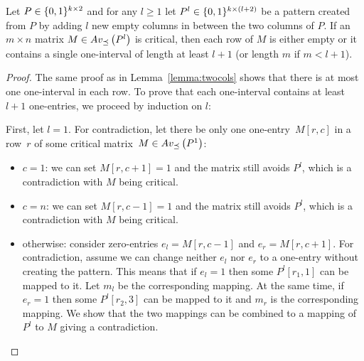 \begin{lemma}
\label{lemma:maxmult}
Let $P\in\{0,1\}^{k\times2}$ and for any $l\geq1$ let $P^l\in\{0,1\}^{k\times(l+2)}$ be a pattern created from $P$ by adding $l$ new empty columns in between the two columns of $P$. If an $m\times n$ matrix $M\in Av_{\preceq}\left(P^l\right)$ is critical, then each row of $M$ is either empty or it contains a single one-interval of length at least $l+1$ (or length $m$ if $m<l+1$).
\end{lemma}
\begin{proof}
The same proof as in Lemma~\ref{lemma:twocols} shows that there is at most one one-interval in each row. To prove that each one-interval contains at least $l+1$ one-entries, we proceed by induction on $l$:

First, let $l=1$. For contradiction, let there be only one one-entry~$M[r,c]$ in a row~$r$ of some critical matrix~$M\in Av_{\preceq}\left(P^1\right)$:
\begin{itemize}
	\item $c=1$: we can set $M[r,c+1]=1$ and the matrix still avoids $P^l$, which is a contradiction with $M$ being critical.
	\item $c=n$: we can set $M[r,c-1]=1$ and the matrix still avoids $P^l$, which is a contradiction with $M$ being critical.
	\item otherwise: consider zero-entries $e_l=M[r,c-1]$ and $e_r=M[r,c+1]$. For contradiction, assume we can change neither $e_l$ nor $e_r$ to a one-entry without creating the pattern. This means that if $e_l=1$ then some $P^l[r_1,1]$ can be mapped to it. Let $m_l$ be the corresponding mapping. At the same time, if $e_r=1$ then some $P^l[r_2,3]$ can be mapped to it and $m_r$ is the corresponding mapping. We show that the two mappings can be combined to a mapping of $P^l$ to $M$ giving a contradiction.
	

\end{itemize}
\end{proof}
